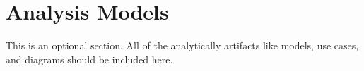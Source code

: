 \section{Analysis Models}
 This is an optional section.  All of the analytically artifacts like models,
 use cases, and diagrams should be included here.  

